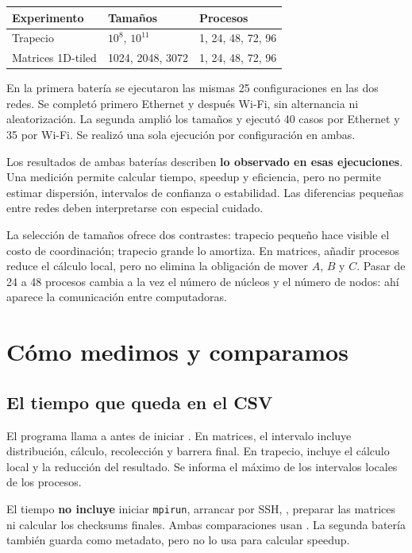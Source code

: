 \begin{center}
\begin{tabular}{lll}
\toprule
Experimento & Tamaños & Procesos \\
\midrule
Trapecio & $10^8$, $10^{11}$ & 1, 24, 48, 72, 96 \\
Matrices 1D-tiled & 1024, 2048, 3072 & 1, 24, 48, 72, 96 \\
\bottomrule
\end{tabular}\end{center}

En la primera batería se ejecutaron las mismas 25 configuraciones en las dos redes. Se completó primero Ethernet y después Wi-Fi, sin alternancia ni aleatorización. La segunda amplió los tamaños y ejecutó 40 casos por Ethernet y 35 por Wi-Fi. Se realizó una sola ejecución por configuración en ambas.

\begin{idea}
Los resultados de ambas baterías describen \textbf{lo observado en esas ejecuciones}. Una medición permite calcular tiempo, speedup y eficiencia, pero no permite estimar dispersión, intervalos de confianza o estabilidad. Las diferencias pequeñas entre redes deben interpretarse con especial cuidado.
\end{idea}

La selección de tamaños ofrece dos contrastes: trapecio pequeño hace visible el costo de coordinación; trapecio grande lo amortiza. En matrices, añadir procesos reduce el cálculo local, pero no elimina la obligación de mover $A$, $B$ y $C$. Pasar de 24 a 48 procesos cambia a la vez el número de núcleos y el número de nodos: ahí aparece la comunicación entre computadoras.

\clearpage
\section{Cómo medimos y comparamos}

\subsection{El tiempo que queda en el CSV}
El programa llama a  antes de iniciar . En matrices, el intervalo incluye distribución, cálculo, recolección y barrera final. En trapecio, incluye el cálculo local y la reducción del resultado. Se informa el máximo de los intervalos locales de los procesos.

El tiempo  \textbf{no incluye} iniciar \texttt{mpirun}, arrancar por SSH, , preparar las matrices ni calcular los checksums finales. Ambas comparaciones usan . La segunda batería también guarda  como metadato, pero no lo usa para calcular speedup.


